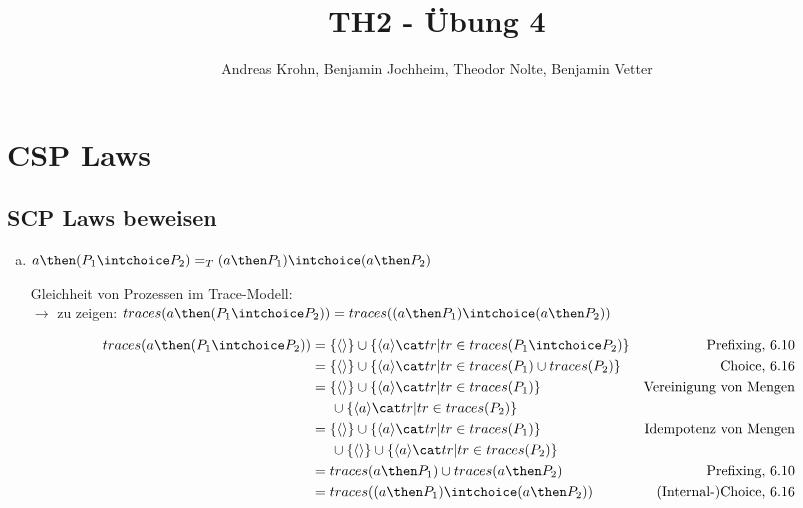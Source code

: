 \documentclass{scrreprt}
\begin{document}
\author{Andreas Krohn, Benjamin Jochheim, Theodor Nolte, Benjamin Vetter}
\title{TH2 - Übung 4}

\maketitle

\chapter{CSP Laws}

\section{SCP Laws beweisen}

\begin{enumerate}[a)]

\item{
  $ a \then (P_1 \intchoice P_2) =_T (a \then P_1) \intchoice (a \then P_2) $

  Gleichheit von Prozessen im Trace-Modell:\\

  $\rightarrow$ zu zeigen: $traces(a \then (P_1 \intchoice P_2)) = traces((a \then P_1) \intchoice (a \then P_2))$

  \begin{align*}
    traces(a \then (P_1 \intchoice P_2)) &= \{ \langle \rangle \} \cup \{ \langle a \rangle \cat tr | tr \in traces(P_1 \intchoice P_2)\} & \text{Prefixing, 6.10}\\
                                         &= \{ \langle \rangle \} \cup \{ \langle a \rangle \cat tr | tr \in traces(P_1) \cup traces(P_2)\} & \text{Choice, 6.16}\\
                                         &= \{ \langle \rangle \} \cup \{ \langle a \rangle \cat tr | tr \in traces(P_1)\} &\text{Vereinigung von Mengen}\\
                                         &\hspace{0.5cm}\cup \{ \langle a \rangle \cat tr | tr \in traces(P_2)\}\\
                                         &= \{ \langle \rangle \} \cup \{ \langle a \rangle \cat tr | tr \in traces(P_1)\} &\text{Idempotenz von Mengen}\\
                                         &\hspace{0.5cm}\cup \{ \langle \rangle \} \cup \{ \langle a \rangle \cat tr | tr \in traces(P_2)\}\\
                                         &= traces(a \then P_1) \cup traces(a \then P_2) &\text{Prefixing, 6.10}\\
                                         &= traces((a \then P_1) \intchoice (a \then P_2)) &\text{(Internal-)Choice, 6.16}\\
  \end{align*}
  \flushright{\qedsymbol}\\
}


\end{enumerate}
\end{document}
